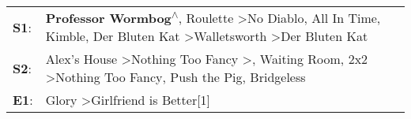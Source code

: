 \begin{supertabular}{p{0.03\textwidth}p{0.92\textwidth}}
 \textbf{S1}:  &  \textbf{Professor Wormbog\textsuperscript{$\wedge$}}, \enspace Roulette\textsuperscript{} \textgreater \enspace No Diablo\textsuperscript{}, \enspace All In Time\textsuperscript{}, \enspace Kimble\textsuperscript{}, \enspace Der Bluten Kat\textsuperscript{} \textgreater \enspace Walletsworth\textsuperscript{} \textgreater \enspace Der Bluten Kat\textsuperscript{}  \enspace  \\
 \textbf{S2}:  &                       Alex's House\textsuperscript{} \textgreater \enspace Nothing Too Fancy\textsuperscript{} \textgreater {}\textsuperscript{}, \enspace Waiting Room\textsuperscript{}, \enspace 2x2\textsuperscript{} \textgreater \enspace Nothing Too Fancy\textsuperscript{}, \enspace Push the Pig\textsuperscript{}, \enspace Bridgeless\textsuperscript{}  \enspace  \\
 \textbf{E1}:  &                                                                                                                                                                                                                                                                                        Glory\textsuperscript{} \textgreater \enspace Girlfriend is Better[1]\textsuperscript{}  \enspace  \\
\end{supertabular}
